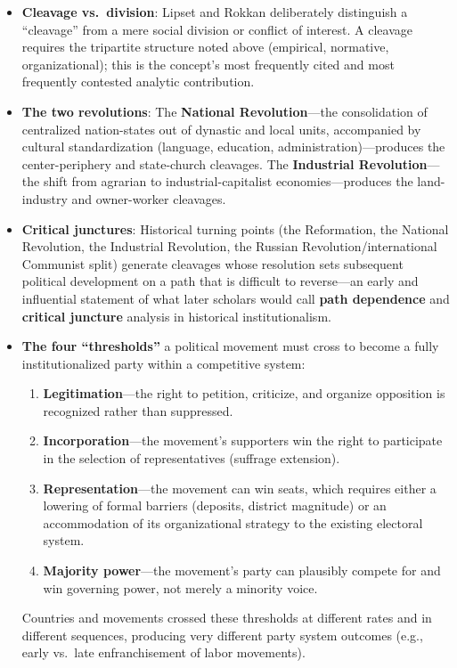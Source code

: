 \documentclass[12pt]{article}
\begin{document}
\begin{itemize}[leftmargin=*, itemsep=4pt]
    \item \textbf{Cleavage vs.\ division}: Lipset and Rokkan deliberately distinguish a ``cleavage'' from a mere social division or conflict of interest. A cleavage requires the tripartite structure noted above (empirical, normative, organizational); this is the concept's most frequently cited and most frequently contested analytic contribution.
    \item \textbf{The two revolutions}: The \textbf{National Revolution}---the consolidation of centralized nation-states out of dynastic and local units, accompanied by cultural standardization (language, education, administration)---produces the center-periphery and state-church cleavages. The \textbf{Industrial Revolution}---the shift from agrarian to industrial-capitalist economies---produces the land-industry and owner-worker cleavages.
    \item \textbf{Critical junctures}: Historical turning points (the Reformation, the National Revolution, the Industrial Revolution, the Russian Revolution/international Communist split) generate cleavages whose resolution sets subsequent political development on a path that is difficult to reverse---an early and influential statement of what later scholars would call \textbf{path dependence} and \textbf{critical juncture} analysis in historical institutionalism.
    \item \textbf{The four ``thresholds''} a political movement must cross to become a fully institutionalized party within a competitive system:
    \begin{enumerate}
        \item \textbf{Legitimation}---the right to petition, criticize, and organize opposition is recognized rather than suppressed.
        \item \textbf{Incorporation}---the movement's supporters win the right to participate in the selection of representatives (suffrage extension).
        \item \textbf{Representation}---the movement can win seats, which requires either a lowering of formal barriers (deposits, district magnitude) or an accommodation of its organizational strategy to the existing electoral system.
        \item \textbf{Majority power}---the movement's party can plausibly compete for and win governing power, not merely a minority voice.
    \end{enumerate}
    Countries and movements crossed these thresholds at different rates and in different sequences, producing very different party system outcomes (e.g., early vs.\ late enfranchisement of labor movements).

\end{itemize}
\end{document}
